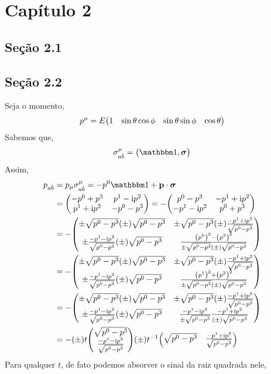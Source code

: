 \section{Capítulo 2}

\subsection{Seção 2.1}

\subsection{Seção 2.2}


Seja o momento, 
\[p^\mu=E\mqty(1&\sin\theta\cos\phi&\sin\theta\sin\phi&\cos\theta)\]
Sabemos que,
\[{\sigma}^{\mu}_{a\dot b}=\mqty(\mathbbm 1,\boldsymbol\sigma)\]
Assim,
\begin{align*}
    p_{a\dot b}&=p_\mu\sigma^\mu_{a\dot b}=-p^0\mathbbm1+\vb p\cdot \boldsymbol\sigma\\
    &=\mqty(-p^0+p^3&p^1-\im p^2\\p^1+\im p^2&-p^0-p^3)=-\mqty(p^0-p^3&-p^1+\im p^2\\-p^1-\im p^2&p^0+p^3)\\
    &=-\mqty(\pm\sqrt{p^0-p^3}\qty(\pm)\sqrt{p^0-p^3}&\pm\sqrt{p^0-p^3}\qty(\pm)\frac{-p^1+\im p^2}{\sqrt{p^0-p^3}}\\
    \pm\frac{-p^1-\im p^2}{\sqrt{p^0-p^3}}\qty(\pm)\sqrt{p^0-p^3}&\frac{\qty(p^0)^2-\qty(p^3)^2}{\pm\sqrt{p^0-p^3}\qty(\pm)\sqrt{p^0-p^3}})\\
    &=-\mqty(\pm\sqrt{p^0-p^3}\qty(\pm)\sqrt{p^0-p^3}&\pm\sqrt{p^0-p^3}\qty(\pm)\frac{-p^1+\im p^2}{\sqrt{p^0-p^3}}\\
    \pm\frac{-p^1-\im p^2}{\sqrt{p^0-p^3}}\qty(\pm)\sqrt{p^0-p^3}&\frac{\qty(p^1)^2+\qty(p^2)^2}{\pm\sqrt{p^0-p^3}\qty(\pm)\sqrt{p^0-p^3}})\\
    &=-\mqty(\pm\sqrt{p^0-p^3}\qty(\pm)\sqrt{p^0-p^3}&\pm\sqrt{p^0-p^3}\qty(\pm)\frac{-p^1+\im p^2}{\sqrt{p^0-p^3}}\\
    \pm\frac{-p^1-\im p^2}{\sqrt{p^0-p^3}}\qty(\pm)\sqrt{p^0-p^3}&\frac{-p^1-\im p^2}{\pm\sqrt{p^0-p^3}}\frac{-p^1+\im p^2}{\qty(\pm)\sqrt{p^0-p^3}})\\
    &=-\qty(\pm)t\mqty(\sqrt{p^0-p^3}\\\frac{-p^1-\im p^2}{\sqrt{p^0-p^3}})\qty(\pm)t^{-1}\mqty(\sqrt{p^0-p^3}&\frac{-p^1+\im p^2}{\sqrt{p^0-p^3}})
\end{align*}
Para qualquer $t$, de fato podemos absorver o sinal da raiz quadrada nele,
